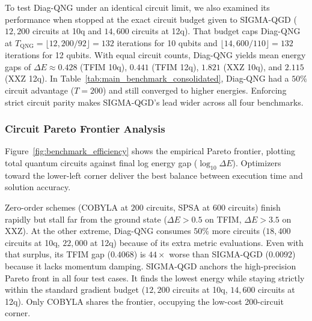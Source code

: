 \documentclass[11pt,a4paper]{article}
\begin{document}
To test Diag-QNG under an identical circuit limit, we also examined its performance when stopped at the exact circuit budget given to SIGMA-QGD ($12,200$ circuits at 10q and $14,600$ circuits at 12q). That budget caps Diag-QNG at $T_{\text{QNG}} = \lfloor 12,200/92 \rfloor = 132$ iterations for 10 qubits and $\lfloor 14,600/110 \rfloor = 132$ iterations for 12 qubits. With equal circuit counts, Diag-QNG yields mean energy gaps of $\Delta E \approx 0.428$ (TFIM 10q), $0.441$ (TFIM 12q), $1.821$ (XXZ 10q), and $2.115$ (XXZ 12q). In Table~\ref{tab:main_benchmark_consolidated}, Diag-QNG had a $50\%$ circuit advantage ($T=200$) and still converged to higher energies. Enforcing strict circuit parity makes SIGMA-QGD's lead wider across all four benchmarks.

\subsubsection{Circuit Pareto Frontier Analysis}
Figure~\ref{fig:benchmark_efficiency} shows the empirical Pareto frontier, plotting total quantum circuits against final log energy gap ($\log_{10} \Delta E$). Optimizers toward the lower-left corner deliver the best balance between execution time and solution accuracy.

Zero-order schemes (COBYLA at $200$ circuits, SPSA at $600$ circuits) finish rapidly but stall far from the ground state ($\Delta E > 0.5$ on TFIM, $\Delta E > 3.5$ on XXZ). At the other extreme, Diag-QNG consumes $50\%$ more circuits ($18,400$ circuits at 10q, $22,000$ at 12q) because of its extra metric evaluations. Even with that surplus, its TFIM gap ($0.4068$) is $44\times$ worse than SIGMA-QGD ($0.0092$) because it lacks momentum damping. SIGMA-QGD anchors the high-precision Pareto front in all four test cases. It finds the lowest energy while staying strictly within the standard gradient budget ($12,200$ circuits at 10q, $14,600$ circuits at 12q). Only COBYLA shares the frontier, occupying the low-cost 200-circuit corner.
\end{document}
